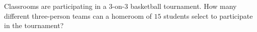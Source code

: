 Classrooms are participating in a $3$-on-$3$ basketball tournament. How many different three-person teams can a homeroom of $15$ students select to participate in the tournament?
